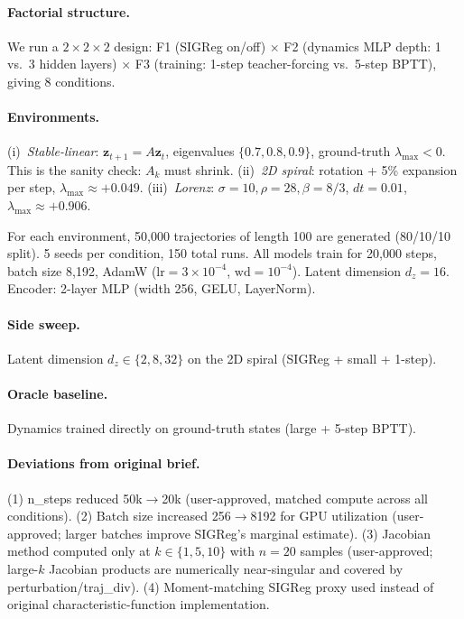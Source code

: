 \documentclass{article}
\begin{document}
\paragraph{Factorial structure.}
We run a $2 \times 2 \times 2$ design:
F1 (SIGReg on/off) $\times$ F2 (dynamics MLP depth: 1 vs.\ 3 hidden layers) $\times$
F3 (training: 1-step teacher-forcing vs.\ 5-step BPTT), giving 8 conditions.

\paragraph{Environments.}
(i)~\emph{Stable-linear}: $\mathbf{z}_{t+1} = A\mathbf{z}_t$, eigenvalues $\{0.7, 0.8, 0.9\}$,
ground-truth $\lambda_{\max} < 0$. This is the sanity check: $A_k$ must shrink.
(ii)~\emph{2D spiral}: rotation + 5\% expansion per step, $\lambda_{\max} \approx +0.049$.
(iii)~\emph{Lorenz}: $\sigma{=}10, \rho{=}28, \beta{=}8/3$, $dt{=}0.01$, $\lambda_{\max} \approx +0.906$.

For each environment, 50,000 trajectories of length 100 are generated (80/10/10 split).
5 seeds per condition, 150 total runs.
All models train for 20,000 steps, batch size 8,192, AdamW ($\text{lr}=3\times10^{-4}$, $\text{wd}=10^{-4}$).
Latent dimension $d_z = 16$. Encoder: 2-layer MLP (width 256, GELU, LayerNorm).

\paragraph{Side sweep.} Latent dimension $d_z \in \{2, 8, 32\}$ on the 2D spiral (SIGReg + small + 1-step).

\paragraph{Oracle baseline.} Dynamics trained directly on ground-truth states (large + 5-step BPTT).

\paragraph{Deviations from original brief.}
(1) n\_steps reduced 50k$\to$20k (user-approved, matched compute across all conditions).
(2) Batch size increased 256$\to$8192 for GPU utilization (user-approved; larger batches improve SIGReg's marginal estimate).
(3) Jacobian method computed only at $k \in \{1, 5, 10\}$ with $n=20$ samples (user-approved; large-$k$ Jacobian products are numerically near-singular and covered by perturbation/traj\_div).
(4) Moment-matching SIGReg proxy used instead of original characteristic-function implementation.
\end{document}
